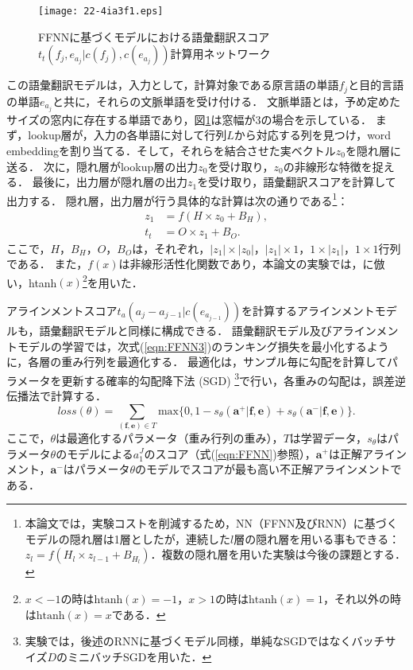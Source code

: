 \documentclass[japanese]{jnlp_1.4}
\begin{document}
\begin{figure}[t]
\begin{center}
\texttt{[image: 22-4ia3f1.eps]}
\end{center}
\caption{FFNNに基づくモデルにおける語彙翻訳スコア$t_{t}(f_{j}, e_{a_{j}}|c(f_{j}),c(e_{a_{j}}))$計算用ネットワーク}
\label{fig:FFNN}
\end{figure}

この語彙翻訳モデルは，入力として，計算対象である原言語の単語$f_{j}$と目的言語の単語$e_{a_{j}}$と共に，それらの文脈単語を受け付ける．
文脈単語とは，予め定めたサイズの窓内に存在する単語であり，図\ref{fig:FFNN}は窓幅が3の場合を示している．
まず，lookup層が，入力の各単語に対して行列$L$から対応する列を見つけ，word embeddingを割り当てる．そして，それらを結合させた実ベクトル$z_{0}$を隠れ層に送る．
次に，隠れ層がlookup層の出力$z_{0}$を受け取り，$z_{0}$の非線形な特徴を捉える．
最後に，出力層が隠れ層の出力$z_{1}$を受け取り，語彙翻訳スコアを計算して出力する．
隠れ層，出力層が行う具体的な計算は次の通りである\footnote{本論文では，実験コストを削減するため，NN（FFNN及びRNN）に基づくモデルの隠れ層は1層としたが，連続した$l$層の隠れ層を用いる事もできる：$z_{l}=f(H_{l} \times z_{l-1} + B_{H_{l}})$．複数の隠れ層を用いた実験は今後の課題とする．}：
\begin{align}
\label{eqn:FFNN2}
z_{1} & =f(H \times z_{0} + B_{H}),\\
t_{t} & =O \times z_{1} + B_{O}.
\end{align}
ここで，$H$，$B_{H}$，$O$，$B_{O}$は，それぞれ，$|z_{1}| \times |z_{0}|$，$|z_{1}| \times 1$，$1 \times |z_{1}|$，$1 \times 1$行列である．
また，$f(x)$は非線形活性化関数であり，本論文の実験では，\cite{yang13}に倣い，htanh$(x)$\footnote{$x<-1$の時は$\mathrm{htanh}(x)=-1$，$x>1$の時は$\mathrm{htanh}(x)=1$，それ以外の時は$\mathrm{htanh}(x)=x$である．}を用いた．

アラインメントスコア$t_{a}(a_{j}-a_{j-1}|c(e_{a_{j-1}}))$を計算するアラインメントモデルも，語彙翻訳モデルと同様に構成できる．
語彙翻訳モデル及びアラインメントモデルの学習では，次式(\ref{eqn:FFNN3})のランキング損失を最小化するように，各層の重み行列を最適化する．
最適化は，サンプル毎に勾配を計算してパラメータを更新する確率的勾配降下法 (SGD) \footnote{実験では，後述のRNNに基づくモデル同様，単純なSGDではなくバッチサイズ$D$のミニバッチSGDを用いた．}で行い，各重みの勾配は，誤差逆伝播法\cite{rumelhart86}で計算する．
\begin{equation}
\label{eqn:FFNN3}
loss(\theta)=\sum_{(\boldsymbol{f},\boldsymbol{e}) \in T}\text{max}\{0,1-s_{\theta}(\boldsymbol{a^{+}}|\boldsymbol{f},\boldsymbol{e})+s_{\theta}(\boldsymbol{a^{-}}|\boldsymbol{f},\boldsymbol{e})\}. 
\end{equation}
ここで，$\theta$は最適化するパラメータ（重み行列の重み），$T$は学習データ，$s_{\theta}$はパラメータ$\theta$のモデルによる$a_{1}^{J}$のスコア（式(\ref{eqn:FFNN})参照），$\boldsymbol{a^{+}}$は正解アラインメント，$\boldsymbol{a^{-}}$はパラメータ$\theta$のモデルでスコアが最も高い不正解アラインメントである．
\end{document}
